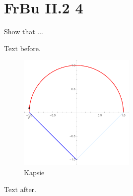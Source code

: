 \section{FrBu II.2 4}

\begin{tcolorbox}[width=\textwidth,
    colback={shadecolor},
    title={Question:},colbacktitle=white,coltitle=black]
    Show that ...
\end{tcolorbox}



Text before.
\begin{figure}[H]
        \centering
        \includegraphics[width=0.5\textwidth]{pics/frbu212.pdf}
        \caption{Kapsie}
\end{figure}
Text after.
